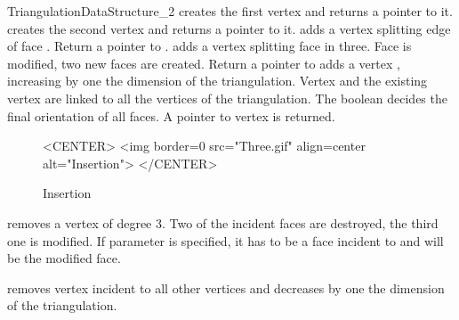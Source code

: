 \begin{ccRefConcept}{TriangulationDataStructure_2}
 {creates the first 
vertex and returns a pointer to it.}
\ccGlue
{} {creates the second 
vertex and returns a pointer to it.}
 {adds a
vertex  splitting 
edge  of face . Return a  pointer to .}
\ccGlue
{} {adds a vertex
 splitting  face
 in three. Face  is modified,
two new faces are created. Return a  pointer to  }
\ccGlue
{} 
{adds
a vertex , increasing by one the dimension of the triangulation.
Vertex  and the existing vertex  are linked to all 
the vertices of the triangulation. 
The boolean  decides the final orientation of all 
faces. A pointer to vertex  is returned.
}

\begin{figure}
\begin{ccTexOnly}
\begin{center}  \end{center}
\caption{Insertion}
\end{ccTexOnly} 

\begin{ccHtmlOnly}
<CENTER>
<img border=0 src="Three.gif" align=center alt="Insertion">
</CENTER>
\end{ccHtmlOnly} 
\end{figure}


{removes a vertex of degree 3. Two of the incident faces are destroyed,
the third one is modified.
If parameter   is specified, it has to be a face incident to 
and will be the modified face.
}



\ccGlue
{}
\ccGlue
{}
{removes vertex  incident to all other vertices
and  decreases by one the dimension of the triangulation.
 }



\end{ccRefConcept}
